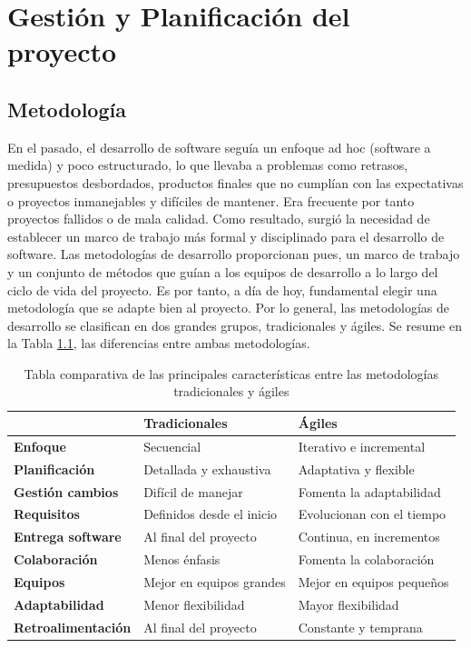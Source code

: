 \chapter{Gestión y Planificación del proyecto}


\section{Metodología}

En el pasado, el desarrollo de software seguía un enfoque ad hoc (software a medida) y poco estructurado, lo que llevaba a problemas como retrasos, presupuestos desbordados, productos finales que no cumplían con las expectativas o proyectos inmanejables y difíciles de mantener. Era frecuente por tanto proyectos fallidos o de mala calidad. Como resultado, surgió la necesidad de establecer un marco de trabajo más formal y disciplinado para el desarrollo de software. Las metodologías de desarrollo proporcionan pues, un marco de trabajo y un conjunto de métodos que guían a los equipos de desarrollo a lo largo del ciclo de vida del proyecto. Es por tanto, a día de hoy, fundamental elegir una metodología que se adapte bien al proyecto.
Por lo general, las metodologías de desarrollo se clasifican en dos grandes grupos, tradicionales y ágiles. Se resume en la Tabla \ref{tabla:resumen_trad_agil}, las diferencias entre ambas metodologías. 


\begin{table}[h!]
    \centering
    \begin{tabular}[t]{lll}
        \toprule
         & \textbf{Tradicionales} & \textbf{Ágiles} \\
        \midrule
        \textbf{Enfoque} & Secuencial & Iterativo e incremental   \\
        \midrule
        \textbf{Planificación} & Detallada y exhaustiva & Adaptativa y flexible   \\
        \midrule
        \textbf{Gestión cambios} & Difícil de manejar & Fomenta la adaptabilidad   \\
        \midrule
        \textbf{Requisitos} & Definidos desde el inicio & Evolucionan con el tiempo     \\
        \midrule
       \textbf{Entrega software} & Al final del proyecto & Continua, en incrementos      \\
        \midrule
        \textbf{Colaboración} & Menos énfasis & Fomenta la colaboración      \\
        \midrule
        \textbf{Equipos} & Mejor en equipos grandes & Mejor en equipos pequeños      \\
        \midrule
        \textbf{Adaptabilidad} & Menor flexibilidad & Mayor flexibilidad      \\
        \midrule
        \textbf{Retroalimentación} & Al final del proyecto & Constante y temprana      \\
        \bottomrule
    \end{tabular}
    \caption{Tabla comparativa de las principales características entre las metodologías tradicionales y ágiles}
    \label{tabla:resumen_trad_agil}
\end{table}


